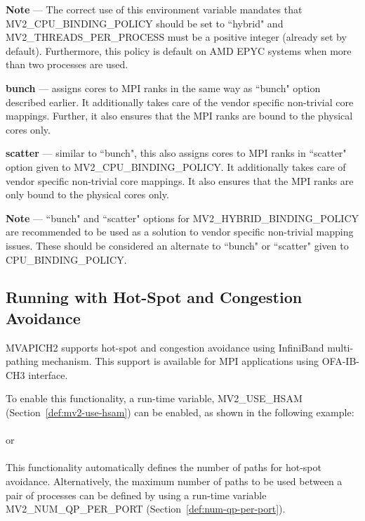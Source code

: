 \textbf{Note} --- The correct use of this environment variable mandates that  \\
MV2\_CPU\_BINDING\_POLICY should be set to ``hybrid" and 
MV2\_THREADS\_PER\_PROCESS must be a positive integer (already set by default).
Furthermore, this policy is default on AMD EPYC systems when more than two
processes are used. 


\textbf{bunch} --- assigns cores to MPI ranks in the same way as ``bunch" option
described earlier. It additionally takes care of the vendor specific 
non-trivial core mappings. Further, it also ensures that the MPI ranks are 
bound to the physical cores only. 

\textbf{scatter} --- similar to ``bunch", this also assigns cores to MPI ranks in 
``scatter" option given to MV2\_CPU\_BINDING\_POLICY. It additionally takes care 
of vendor specific non-trivial core mappings. It also 
ensures that the MPI ranks are only bound to the physical cores only.

\textbf{Note} --- ``bunch" and ``scatter" options for MV2\_HYBRID\_BINDING\_POLICY are 
recommended to be used as a solution to vendor specific non-trivial mapping issues. These 
should be considered an alternate to ``bunch" or ``scatter" given to CPU\_BINDING\_POLICY.

\subsection{Running with Hot-Spot and Congestion Avoidance}
\label{def:mv2-hsam}
MVAPICH2 supports hot-spot and congestion avoidance using InfiniBand
multi-pathing mechanism. This support is available for MPI applications
using OFA-IB-CH3 interface.

To enable this functionality, a run-time variable,
MV2\_USE\_HSAM (Section~\ref{def:mv2-use-hsam})
can be enabled, as shown in the following example:
\\
 \\
or \\
 \\

This functionality automatically defines the number of paths for
hot-spot avoidance. Alternatively, the maximum number of paths to be
used between a pair of processes can be defined by using a run-time
variable MV2\_NUM\_QP\_PER\_PORT (Section~\ref{def:num-qp-per-port}).

